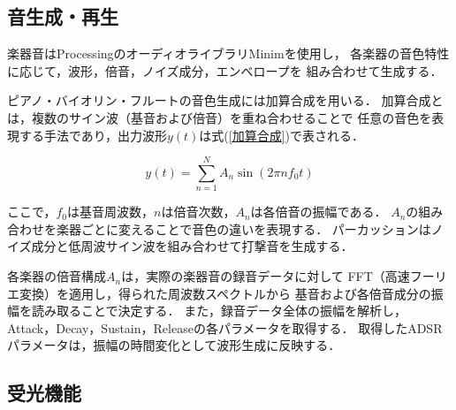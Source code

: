\documentclass[lualatex,book,openany,paper=a4paper,jafontsize=11.5pt,jafontscale=1.05]{jlreq}
\begin{document}
\begin{table}[H]
  \centering
   \caption{LEDマトリクスを使用するためのコード} \label{tab:matrixCode}
\end{table}

\subsection{音生成・再生}
楽器音はProcessingのオーディオライブラリMinimを使用し，
各楽器の音色特性に応じて，波形，倍音，ノイズ成分，エンベロープを
組み合わせて生成する．

ピアノ・バイオリン・フルートの音色生成には加算合成を用いる．
加算合成とは，複数のサイン波（基音および倍音）を重ね合わせることで
任意の音色を表現する手法であり，出力波形$y(t)$は式(\ref{加算合成})で表される．

\begin{equation}
  y(t) = \sum_{n=1}^{N} A_n \sin(2\pi n f_0 t)
  \label{加算合成}
\end{equation}

ここで，$f_0$は基音周波数，$n$は倍音次数，$A_n$は各倍音の振幅である．
$A_n$の組み合わせを楽器ごとに変えることで音色の違いを表現する．
パーカッションはノイズ成分と低周波サイン波を組み合わせて打撃音を生成する．

各楽器の倍音構成$A_n$は，実際の楽器音の録音データに対して
FFT（高速フーリエ変換）を適用し，得られた周波数スペクトルから
基音および各倍音成分の振幅を読み取ることで決定する．
また，録音データ全体の振幅を解析し，
Attack，Decay，Sustain，Releaseの各パラメータを取得する．
取得したADSRパラメータは，振幅の時間変化として波形生成に反映する．

\subsection{受光機能}
\end{document}
